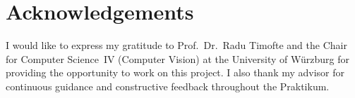 \chapter*{Acknowledgements}

I would like to express my gratitude to Prof.\ Dr.\ Radu Timofte and the Chair for Computer Science~IV (Computer Vision) at the University of W\"urzburg for providing the opportunity to work on this project. I also thank my advisor for continuous guidance and constructive feedback throughout the Praktikum.
